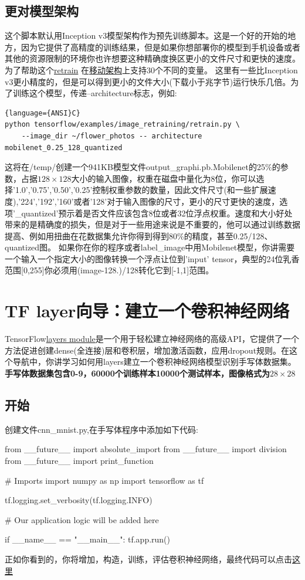 \subsection{更对模型架构}
这个脚本默认用Inception v3模型架构作为预先训练脚本。这是一个好的开始的地方，因为它提供了高精度的训练结果，但是如果你想部署你的模型到手机设备或者其他的资源限制的环境你也许想要这种精确度换区更小的文件尺寸和更快的速度。
为了帮助这个\href{https://github.com/tensorflow/tensorflow/blob/master/tensorflow/examples/image_retraining/retrain.py}{retrain}
在\href{https://research.googleblog.com/2017/06/mobilenets-open-source-models-for.html}{移动架构}上支持30个不同的变量。
这里有一些比Inception v3更小精度的，但是可以得到更小的文件大小(下载小于兆字节)运行快乐几倍。为了训练这个模型，传递--architecture标志，例如:
\begin{lstlisting}{language={ANSI}C}
python tensorflow/examples/image_retraining/retrain.py \
    --image_dir ~/flower_photos -- architecture mobilenet_0.25_128_quantized
\end{lstlisting}
这将在/temp/创建一个941KB模型文件output\_graphi.pb.Mobilenet的25\%的参数，占据$128\times128$大小的输入图像，权重在磁盘中量化为8位，你可以选择'1.0','0.75','0.50','0.25'控制权重参数的数量，因此文件尺寸(和一些扩展速度),'224','192','160'或者'128'对于输入图像的尺寸，更小的尺寸更快的速度，选项'\_quantized'预示着是否文件应该包含8位或者32位浮点权重。速度和大小好处带来的是精确度的损失，但是对于一些用途来说是不重要的，他可以通过训练数据提高、例如用扭曲在花数据集允许你得到得到80\%的精度，甚至0.25/128、quantized图。
如果你在你的程序或者label\_image中用Mobilenet模型，你讲需要一个输入一个指定大小的图像转换一个浮点让位到'input' tensor，典型的24位乳香范围[0,255]你必须用(image-128.)/128转化它到[-1,1]范围。
\section{TF layer向导：建立一个卷积神经网络}
TensorFlow\href{https://www.tensorflow.org/api_docs/python/tf/layers}{layers module}是一个用于轻松建立神经网络的高级API，它提供了一个方法促进创建dense(全连接)层和卷积层，增加激活函数，应用dropout规则。在这个导航中，你讲学习如何用layers建立一个卷积神经网络模型识别手写体数据集。
\textbf{手写体数据集包含0-9，60000个训练样本10000个测试样本，图像格式为}$28\times28$
\subsection{开始}
创建文件cnn\_mnist.py,在手写体程序中添加如下代码:
\begin{python}
from __future__ import absolute_import
from __future__ import division
from __future__ import print_function

# Imports
import numpy as np
import tensorflow as tf

tf.logging.set_verbosity(tf.logging.INFO)

# Our application logic will be added here

if __name__ == "__main__":
  tf.app.run()
\end{python}
正如你看到的，你将增加，构造，训练，评估卷积神经网络，最终代码可以点击\href{https://www.github.com/tensorflow/tensorflow/blob/r1.3/tensorflow/examples/tutorials/layers/cnn_mnist.py}{这里}
